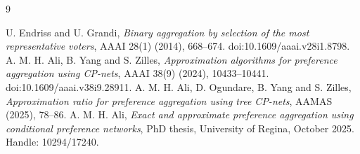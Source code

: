 \documentclass[11pt]{amsart}
\begin{document}
\begin{thebibliography}{9}
\raggedright
{} U. Endriss and U. Grandi,
\emph{Binary aggregation by selection of the most representative voters},
AAAI 28(1) (2014), 668--674. doi:10.1609/aaai.v28i1.8798.
 A. M. H. Ali, B. Yang and S. Zilles,
\emph{Approximation algorithms for preference aggregation using CP-nets},
AAAI 38(9) (2024), 10433--10441. doi:10.1609/aaai.v38i9.28911.
 A. M. H. Ali, D. Ogundare, B. Yang and S. Zilles,
\emph{Approximation ratio for preference aggregation using tree CP-nets},
AAMAS (2025), 78--86.
 A. M. H. Ali,
\emph{Exact and approximate preference aggregation using conditional preference
networks}, PhD thesis, University of Regina, October 2025.
Handle: 10294/17240.
\end{thebibliography}
\end{document}
